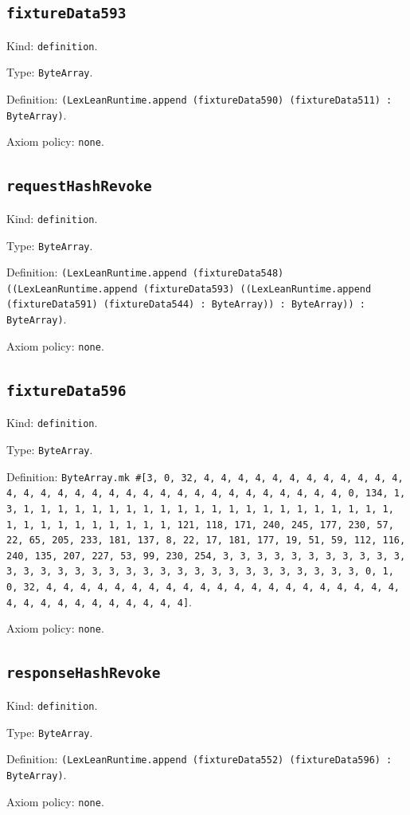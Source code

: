 \documentclass[11pt]{article}
\begin{document}
\subsection*{\texttt{fixtureData593}}
\noindent Kind: \texttt{definition}.\par
\noindent Type: \texttt{ByteArray}.\par
\noindent Definition: \texttt{(LexLeanRuntime.append (fixtureData590) (fixtureData511) : ByteArray)}.\par
\noindent Axiom policy: \texttt{none}.\par
\subsection*{\texttt{requestHashRevoke}}
\noindent Kind: \texttt{definition}.\par
\noindent Type: \texttt{ByteArray}.\par
\noindent Definition: \texttt{(LexLeanRuntime.append (fixtureData548) ((LexLeanRuntime.append (fixtureData593) ((LexLeanRuntime.append (fixtureData591) (fixtureData544) : ByteArray)) : ByteArray)) : ByteArray)}.\par
\noindent Axiom policy: \texttt{none}.\par
\subsection*{\texttt{fixtureData596}}
\noindent Kind: \texttt{definition}.\par
\noindent Type: \texttt{ByteArray}.\par
\noindent Definition: \texttt{ByteArray.mk \#[3, 0, 32, 4, 4, 4, 4, 4, 4, 4, 4, 4, 4, 4, 4, 4, 4, 4, 4, 4, 4, 4, 4, 4, 4, 4, 4, 4, 4, 4, 4, 4, 4, 4, 4, 0, 134, 1, 3, 1, 1, 1, 1, 1, 1, 1, 1, 1, 1, 1, 1, 1, 1, 1, 1, 1, 1, 1, 1, 1, 1, 1, 1, 1, 1, 1, 1, 1, 1, 1, 1, 121, 118, 171, 240, 245, 177, 230, 57, 22, 65, 205, 233, 181, 137, 8, 22, 17, 181, 177, 19, 51, 59, 112, 116, 240, 135, 207, 227, 53, 99, 230, 254, 3, 3, 3, 3, 3, 3, 3, 3, 3, 3, 3, 3, 3, 3, 3, 3, 3, 3, 3, 3, 3, 3, 3, 3, 3, 3, 3, 3, 3, 3, 3, 3, 0, 1, 0, 32, 4, 4, 4, 4, 4, 4, 4, 4, 4, 4, 4, 4, 4, 4, 4, 4, 4, 4, 4, 4, 4, 4, 4, 4, 4, 4, 4, 4, 4, 4, 4, 4]}.\par
\noindent Axiom policy: \texttt{none}.\par
\subsection*{\texttt{responseHashRevoke}}
\noindent Kind: \texttt{definition}.\par
\noindent Type: \texttt{ByteArray}.\par
\noindent Definition: \texttt{(LexLeanRuntime.append (fixtureData552) (fixtureData596) : ByteArray)}.\par
\noindent Axiom policy: \texttt{none}.\par
\end{document}
